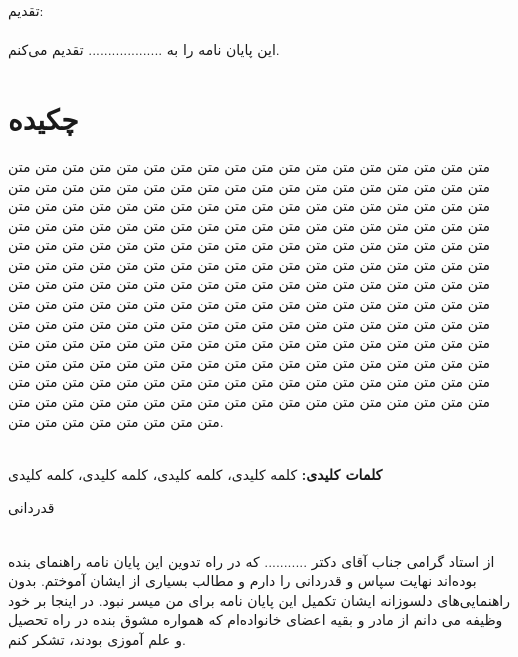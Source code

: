 \documentclass[a4paper,oneside]{book}
\begin{document}

  
 


\newpage
	

	\newpage
	\huge{تقدیم:}\\
	\hfill\\
	\large{این پایان نامه را به ................... تقدیم می‌کنم.}

	
	

	
	
	
	

\chapter*{چکیده}
\begin{spacing}{2}
متن متن متن متن متن متن متن متن متن متن متن متن متن متن متن متن متن متن متن متن متن متن متن متن متن متن متن متن متن متن متن متن متن متن متن متن متن متن متن متن متن متن متن متن متن متن متن متن متن متن متن متن متن متن متن متن متن متن متن متن متن متن متن متن متن متن متن متن متن متن متن متن متن متن متن متن متن متن متن متن متن متن متن متن متن متن متن متن متن متن متن متن متن متن متن متن متن متن متن متن متن متن متن متن متن متن متن متن متن متن متن متن متن متن متن متن متن متن متن متن متن متن متن متن متن متن متن متن متن متن متن متن متن متن متن متن متن متن متن متن متن متن متن متن متن متن متن متن متن متن متن متن متن متن متن متن متن متن متن متن متن متن متن متن متن متن متن متن متن متن متن متن متن متن متن متن متن متن متن متن متن متن متن متن متن متن متن متن متن متن متن متن متن متن متن متن متن متن متن متن متن متن متن متن متن متن متن متن متن متن متن متن متن متن متن متن متن متن متن متن متن متن متن متن متن متن متن متن متن متن متن متن متن متن متن متن متن متن متن متن متن متن.\\\\
\end{spacing}

\textbf{کلمات کلیدی:}
کلمه کلیدی، کلمه کلیدی، کلمه کلیدی، کلمه کلیدی
	
	
	
	
	
\newpage
\begin{center}
		{\LARGE قدردانی}\\
		\hfill\\
		
\end{center}
	از استاد گرامی جناب آقای دکتر ........... که در راه تدوین این پایان نامه راهنمای بنده بوده‌اند نهایت سپاس و قدردانی را دارم و مطالب بسیاری از ایشان آموختم. بدون راهنمایی‌های دلسوزانه ایشان تکمیل این پایان نامه برای من میسر نبود.
	در اینجا بر خود وظیفه می دانم از مادر و بقیه اعضای خانواده‌ام که همواره مشوق بنده در راه تحصیل و علم آموزی بودند، تشکر کنم.\\
	
\end{document}
